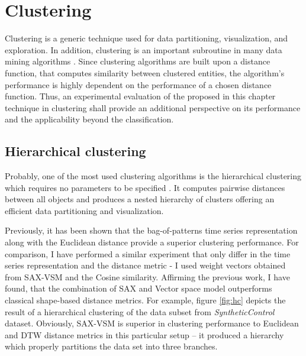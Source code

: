 \section{Clustering}
Clustering is a generic technique used for data partitioning, visualization, and exploration.
In addition, clustering is an important subroutine in many data mining algorithms \cite{citeulike:167581}.
Since clustering algorithms are built upon a distance function, that computes similarity between clustered entities,
the algorithm's performance is highly dependent on the performance of a chosen distance function. 
Thus, an experimental evaluation of the proposed in this chapter technique in clustering shall provide an additional 
perspective on its performance and the applicability beyond the classification.

\subsection{Hierarchical clustering}
Probably, one of the most used clustering algorithms is the hierarchical clustering which requires no
parameters to be specified \cite{citeulike:1576606}. It computes pairwise distances between all objects and 
produces a nested hierarchy of clusters offering an efficient data partitioning and visualization. 

Previously, it has been shown that the bag-of-patterns time series representation along with the Euclidean distance
provide a superior clustering performance\cite{citeulike:10525778}. 
For comparison, I have performed a similar experiment that only differ in the time series representation and
the distance metric - I used \tfidf weight vectors obtained from SAX-VSM and the Cosine similarity. 
Affirming the previous work, I have found, that the combination of SAX and Vector space model outperforms 
classical shape-based distance metrics. 
For example, figure \ref{fig:hc} depicts the result of a hierarchical clustering of the data subset from 
\textit{SyntheticControl} dataset. 
Obviously, SAX-VSM is superior in clustering performance to Euclidean and DTW distance metrics in this particular setup -- 
it produced a hierarchy which properly partitions the data set into three branches.

